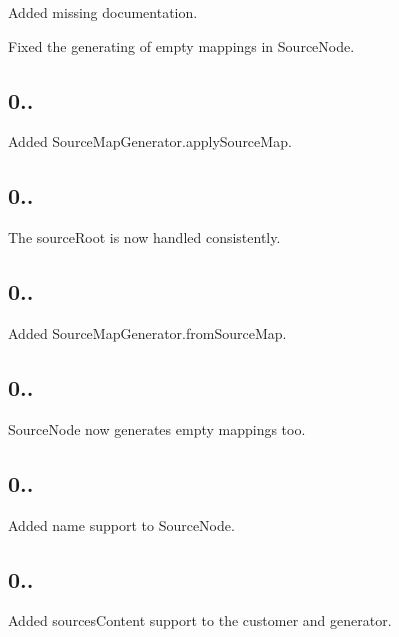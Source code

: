 \begin{DoxyItemize}
\item Added missing documentation.
\item Fixed the generating of empty mappings in Source\+Node.
\end{DoxyItemize}

\subsection*{0..}


\begin{DoxyItemize}
\item Added Source\+Map\+Generator.\+apply\+Source\+Map.
\end{DoxyItemize}

\subsection*{0..}


\begin{DoxyItemize}
\item The source\+Root is now handled consistently.
\end{DoxyItemize}

\subsection*{0..}


\begin{DoxyItemize}
\item Added Source\+Map\+Generator.\+from\+Source\+Map.
\end{DoxyItemize}

\subsection*{0..}


\begin{DoxyItemize}
\item Source\+Node now generates empty mappings too.
\end{DoxyItemize}

\subsection*{0..}


\begin{DoxyItemize}
\item Added name support to Source\+Node.
\end{DoxyItemize}

\subsection*{0..}


\begin{DoxyItemize}
\item Added sources\+Content support to the customer and generator. 
\end{DoxyItemize}